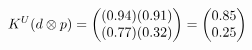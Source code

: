 \documentclass[preview]{standalone}
\begin{document}
\begin{align*}
\special{dvisvgm:raw <g id='unique000'>}K^U(d \otimes p) = \begin{pmatrix} (0.94)(0.91) \\ (0.77)(0.32) \end{pmatrix} = \begin{pmatrix} 0.85 \\ 0.25 \end{pmatrix}\special{dvisvgm:raw </g>}
\end{align*}
\end{document}
